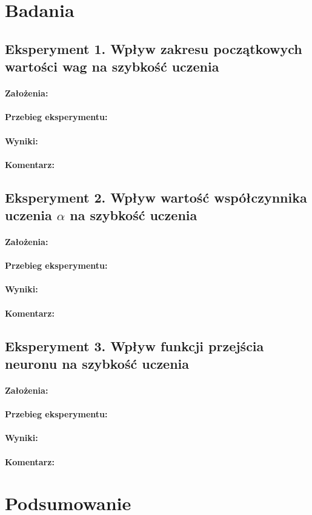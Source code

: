 \documentclass{article}
\begin{document}
	\section{Badania}

	\subsection*{Eksperyment 1. Wpływ zakresu początkowych wartości wag na szybkość uczenia}
	\paragraph{Założenia: } 
	\paragraph{Przebieg eksperymentu: }
	\paragraph{Wyniki: }
	\paragraph{Komentarz: }

	\subsection*{Eksperyment 2. Wpływ wartość współczynnika uczenia $\alpha$ na szybkość uczenia}
	\paragraph{Założenia: }
	\paragraph{Przebieg eksperymentu: }
	\paragraph{Wyniki: }
	\paragraph{Komentarz: }

	\subsection*{Eksperyment 3. Wpływ funkcji przejścia neuronu na szybkość uczenia}
	\paragraph{Założenia: }
	\paragraph{Przebieg eksperymentu: }
	\paragraph{Wyniki: }
	\paragraph{Komentarz: }
	\section{Podsumowanie}
\end{document}
